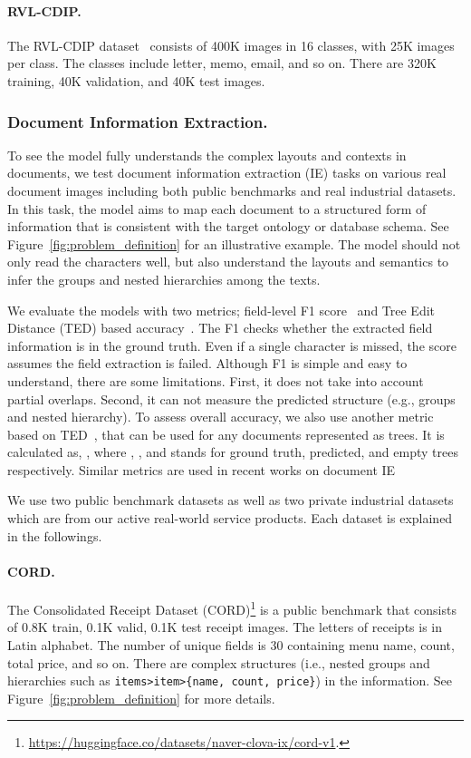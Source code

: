 \documentclass[runningheads]{llncs}
\begin{document}
\paragraph{RVL-CDIP.}
The RVL-CDIP dataset~\cite{harley2015icdar} consists of 400K images in 16 classes, with 25K images per class. The classes include letter, memo, email, and so on. There are 320K training, 40K validation, and 40K test images. 

\subsubsection{Document Information Extraction.}
To see the model fully understands the complex layouts and contexts in documents, we test document information extraction (IE) tasks on various real document images including both public benchmarks and real industrial datasets.
In this task, the model aims to map each document to a structured form of information that is consistent with the target ontology or database schema. See Figure~\ref{fig:problem_definition} for an illustrative example. The model should not only read the characters well, but also understand the layouts and semantics to infer the groups and nested hierarchies among the texts.

We evaluate the models with two metrics; field-level F1 score~\cite{hwang2019pot,xu2019_layoutLM,hong2021bros} and Tree Edit Distance (TED) based accuracy~\cite{ted,teds,hwang2021costeffective}.
The F1 checks whether the extracted field information is in the ground truth. Even if a single character is missed, the score assumes the field extraction is failed.
Although F1 is simple and easy to understand, there are some limitations. First, it does not take into account partial overlaps. Second, it can not measure the predicted structure (e.g., groups and nested hierarchy).
To assess overall accuracy, we also use another metric based on TED~\cite{ted}, that can be used for any documents represented as trees. It is calculated as, , where , , and  stands for ground truth, predicted, and empty trees respectively. Similar metrics are used in recent works on document IE~\cite{teds,hwang2021costeffective}

We use two public benchmark datasets as well as two private industrial datasets which are from our active real-world service products.
Each dataset is explained in the followings.

\paragraph{CORD.}
The Consolidated Receipt Dataset (CORD)\footnote{\url{https://huggingface.co/datasets/naver-clova-ix/cord-v1}.}\cite{park2019cord} is a public benchmark that consists of 0.8K train, 0.1K valid, 0.1K test receipt images.
The letters of receipts is in Latin alphabet.
The number of unique fields is 30 containing menu name, count, total price, and so on.
There are complex structures (i.e., nested groups and hierarchies such as \texttt{\small items>item>{\scriptsize\{}name, count, price{\scriptsize\}}}) in the information.
See Figure~\ref{fig:problem_definition} for more details.
\end{document}
